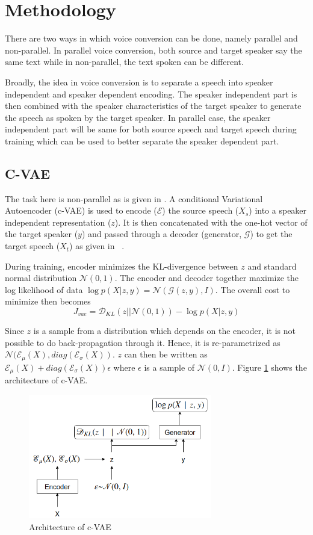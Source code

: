 \documentclass[letterpaper]{article}
\begin{document}
\section{Methodology}
There are two ways in which voice conversion can be done, namely parallel and non-parallel. In parallel voice conversion, both source and target speaker say the same text while in non-parallel, the text spoken can be different. 

Broadly, the idea in voice conversion is to separate a speech into speaker independent and speaker dependent encoding. The speaker independent part is then combined with the speaker characteristics of the target speaker to generate the speech as spoken by the target speaker. In parallel case, the speaker independent part will be same for both source speech and target speech during training which can be used to better separate the speaker dependent part. 

\subsection{C-VAE}
The task here is non-parallel as is given in \cite{vae}. A conditional Variational Autoencoder (c-VAE) \cite{NIPS2015_5775} is used to encode ($\mathcal{E}$) the source speech ($X_s$) into a speaker independent representation ($z$). It is then concatenated with the one-hot vector of the target speaker ($y$) and passed through a decoder (generator, $\mathcal{G}$) to get the target speech ($X_t$) as given in ~\cite{vae}.

During training, encoder minimizes the KL-divergence between $z$ and standard normal distribution $\mathcal{N}(0,1)$. The encoder and decoder together maximize the log likelihood of data $\log p(X|z,y)=\mathcal{N}(\mathcal{G}(z,y),I)$. The overall cost to minimize then becomes
\[J_{vae}=\mathcal{D}_{KL}(z||\mathcal{N}(0,1)) - \log p(X|z,y) \]

Since $z$ is a sample from a distribution which depends on the encoder, it is not possible to do back-propagation through it. Hence, it is re-parametrized as $\mathcal{N}(\mathcal{E_\mu}(X), diag(\mathcal{E_\sigma}(X))$. $z$ can then be written as $\mathcal{E_\mu}(X)+diag(\mathcal{E_\sigma}(X))\epsilon$ where $\epsilon$ is a sample of $\mathcal{N}(0,I)$. Figure \ref{fig:vae} shows the architecture of c-VAE.

\begin{figure}[h]
	\includegraphics[width=8cm]{images/VAE_network}
    \caption{Architecture of c-VAE}
	\label{fig:vae}
\end{figure}
\end{document}
